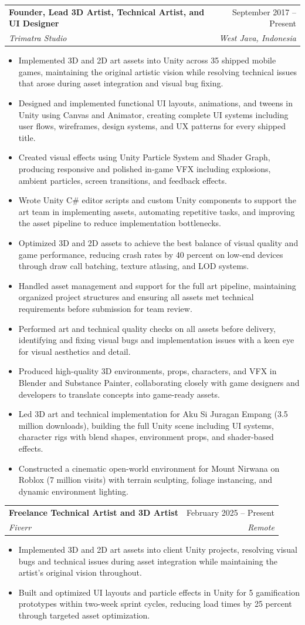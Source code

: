 \documentclass[letterpaper,11pt]{article}
\makeatletter
\newcommand{\resumeItem}[1]{
  \item\small{
    {#1 \vspace{-2pt}}
  }
}
\newcommand{\resumeSubheading}[4]{
  \vspace{-2pt}\item
    \begin{tabular*}{0.97\textwidth}[t]{l@{\extracolsep{\fill}}r}
      \textbf{#1} & #2 \\
      \textit{\small#3} & \textit{\small #4} \\
    \end{tabular*}\vspace{-7pt}
}
\newcommand{\resumeItemListStart}{\begin{itemize}}
\newcommand{\resumeItemListEnd}{\end{itemize}\vspace{-5pt}}
\makeatother
\begin{document}
    \resumeSubheading
      {Founder, Lead 3D Artist, Technical Artist, and UI Designer}{September 2017 -- Present}
      {Trimatra Studio}{West Java, Indonesia}
      \resumeItemListStart
        \resumeItem{Implemented 3D and 2D art assets into Unity across 35 shipped mobile games, maintaining the original artistic vision while resolving technical issues that arose during asset integration and visual bug fixing.}
        \resumeItem{Designed and implemented functional UI layouts, animations, and tweens in Unity using Canvas and Animator, creating complete UI systems including user flows, wireframes, design systems, and UX patterns for every shipped title.}
        \resumeItem{Created visual effects using Unity Particle System and Shader Graph, producing responsive and polished in-game VFX including explosions, ambient particles, screen transitions, and feedback effects.}
        \resumeItem{Wrote Unity C\# editor scripts and custom Unity components to support the art team in implementing assets, automating repetitive tasks, and improving the asset pipeline to reduce implementation bottlenecks.}
        \resumeItem{Optimized 3D and 2D assets to achieve the best balance of visual quality and game performance, reducing crash rates by 40 percent on low-end devices through draw call batching, texture atlasing, and LOD systems.}
        \resumeItem{Handled asset management and support for the full art pipeline, maintaining organized project structures and ensuring all assets met technical requirements before submission for team review.}
        \resumeItem{Performed art and technical quality checks on all assets before delivery, identifying and fixing visual bugs and implementation issues with a keen eye for visual aesthetics and detail.}
        \resumeItem{Produced high-quality 3D environments, props, characters, and VFX in Blender and Substance Painter, collaborating closely with game designers and developers to translate concepts into game-ready assets.}
        \resumeItem{Led 3D art and technical implementation for Aku Si Juragan Empang (3.5 million downloads), building the full Unity scene including UI systems, character rigs with blend shapes, environment props, and shader-based effects.}
        \resumeItem{Constructed a cinematic open-world environment for Mount Nirwana on Roblox (7 million visits) with terrain sculpting, foliage instancing, and dynamic environment lighting.}
      \resumeItemListEnd

    \resumeSubheading
      {Freelance Technical Artist and 3D Artist}{February 2025 -- Present}
      {Fiverr}{Remote}
      \resumeItemListStart
        \resumeItem{Implemented 3D and 2D art assets into client Unity projects, resolving visual bugs and technical issues during asset integration while maintaining the artist's original vision throughout.}
        \resumeItem{Built and optimized UI layouts and particle effects in Unity for 5 gamification prototypes within two-week sprint cycles, reducing load times by 25 percent through targeted asset optimization.}
      \resumeItemListEnd
\end{document}
